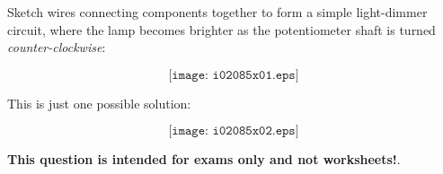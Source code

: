 

Sketch wires connecting components together to form a simple light-dimmer circuit, where the lamp becomes brighter as the potentiometer shaft is turned {\it counter-clockwise}:

\vskip 30pt

$$\texttt{[image: i02085x01.eps]}$$







This is just one possible solution:

$$\texttt{[image: i02085x02.eps]}$$
 






{\bf This question is intended for exams only and not worksheets!}.



